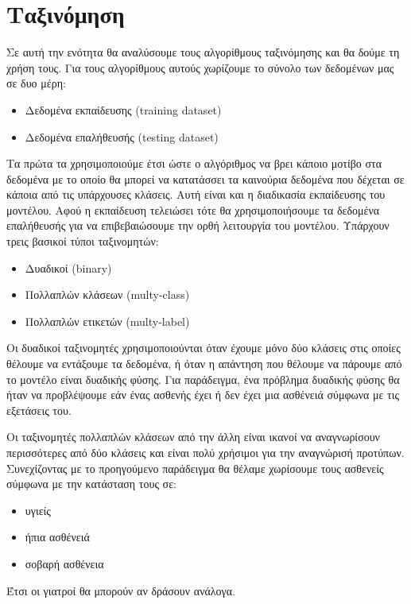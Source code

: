 \newpage
\section{Ταξινόμηση}
Σε αυτή την ενότητα θα αναλύσουμε τους αλγορίθμους
ταξινόμησης και θα δούμε τη χρήση τους. Για τους αλγορίθμους
αυτούς χωρίζουμε το σύνολο των δεδομένων μας σε δυο μέρη:
\begin{itemize}
    \item Δεδομένα εκπαίδευσης (\textlatin{training dataset})
    \item Δεδομένα επαλήθευσής (\textlatin{testing dataset})
\end{itemize}
Τα πρώτα τα χρησιμοποιούμε έτσι ώστε ο αλγόριθμος να βρει
κάποιο μοτίβο στα δεδομένα με το οποίο θα μπορεί να
κατατάσσει τα καινούρια δεδομένα που δέχεται σε κάποια
από τις υπάρχουσες κλάσεις. Αυτή είναι και η διαδικασία
εκπαίδευσης του μοντέλου. Αφού η εκπαίδευση τελειώσει τότε
θα χρησιμοποιήσουμε τα δεδομένα επαλήθευσής για να
επιβεβαιώσουμε την ορθή λειτουργία του μοντέλου.
Υπάρχουν τρεις βασικοί τύποι ταξινομητών:
\begin{itemize}
    \item Δυαδικοί (\textlatin{binary})
    \item Πολλαπλών κλάσεων (\textlatin{multy-class})
    \item Πολλαπλών ετικετών (\textlatin{multy-label})
\end{itemize}

Οι δυαδικοί ταξινομητές χρησιμοποιούνται όταν έχουμε μόνο
δύο κλάσεις στις οποίες θέλουμε να εντάξουμε τα δεδομένα,
ή όταν η απάντηση που θέλουμε να πάρουμε από το μοντέλο
είναι δυαδικής φύσης. Για παράδειγμα, ένα πρόβλημα δυαδικής
φύσης θα ήταν να προβλέψουμε εάν ένας ασθενής έχει ή δεν
έχει μια ασθένειά σύμφωνα με τις εξετάσεις του.

Οι ταξινομητές πολλαπλών κλάσεων από την άλλη είναι ικανοί
να αναγνωρίσουν περισσότερες από δύο κλάσεις και είναι πολύ
χρήσιμοι για την αναγνώρισή προτύπων. Συνεχίζοντας με το
προηγούμενο παράδειγμα θα θέλαμε χωρίσουμε τους ασθενείς
σύμφωνα με την κατάσταση τους σε:
\begin{itemize}
    \item υγιείς
    \item ήπια ασθένειά
    \item σοβαρή ασθένεια
\end{itemize}
Έτσι οι γιατροί θα μπορούν αν δράσουν ανάλογα.

